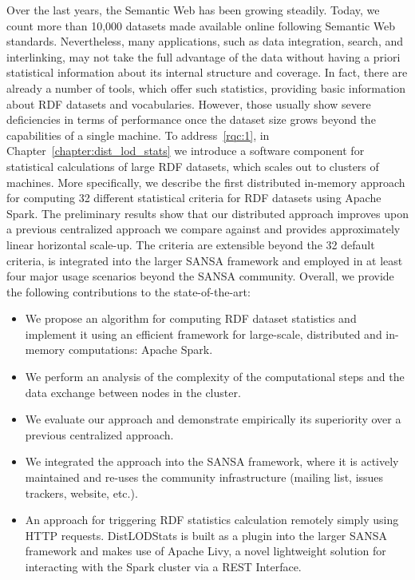 Over the last years, the Semantic Web has been growing steadily. 
Today, we count more than 10,000 datasets made available online following Semantic Web standards.
Nevertheless, many applications, such as data integration, search, and interlinking, may not take the full advantage of the data without having a priori statistical information about its internal structure and coverage.
In fact, there are already a number of tools, which offer such statistics, providing basic information about \gls{RDF} datasets and vocabularies.
However, those usually show severe deficiencies in terms of performance once the dataset size grows beyond the capabilities of a single machine.
To address~\ref{rqc:1}, in Chapter~\ref{chapter:dist_lod_stats} we introduce a software component for statistical calculations of large \gls{RDF} datasets, which scales out to clusters of machines.
More specifically, we describe the first distributed in-memory approach for computing 32 different statistical criteria for \gls{RDF} datasets using Apache Spark.
The preliminary results show that our distributed approach improves upon a previous centralized approach we compare against and provides approximately linear horizontal scale-up. 
The criteria are extensible beyond the 32 default criteria, is integrated into the larger SANSA framework and employed in at least four major usage scenarios beyond the SANSA community.
Overall, we provide the following contributions to the state-of-the-art:

\begin{itemize}
    \item We propose an algorithm for computing \gls{RDF} dataset statistics and implement it using an efficient framework for large-scale, distributed and in-memory computations: Apache Spark.
    \item We perform an analysis of the complexity of the computational steps and the data exchange between nodes in the cluster. 
    \item We evaluate our approach and demonstrate empirically its superiority over a previous centralized approach.
    \item We integrated the approach into the SANSA framework, where it is actively maintained and re-uses the community infrastructure (mailing list, issues trackers, website, etc.).
    \item An approach for triggering \gls{RDF} statistics calculation remotely simply using HTTP requests. 
    DistLODStats is built as a plugin into the larger SANSA framework and makes use of Apache Livy, a novel lightweight solution for interacting with the Spark cluster via a REST Interface.
\end{itemize}

